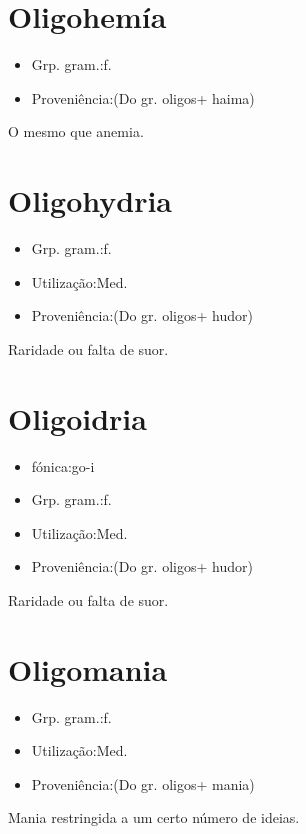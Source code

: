 \section{Oligohemía}
\begin{itemize}
\item {Grp. gram.:f.}
\end{itemize}
\begin{itemize}
\item {Proveniência:(Do gr. \textunderscore oligos\textunderscore  + \textunderscore haima\textunderscore )}
\end{itemize}
O mesmo que \textunderscore anemia\textunderscore .
\section{Oligohydria}
\begin{itemize}
\item {Grp. gram.:f.}
\end{itemize}
\begin{itemize}
\item {Utilização:Med.}
\end{itemize}
\begin{itemize}
\item {Proveniência:(Do gr. \textunderscore oligos\textunderscore  + \textunderscore hudor\textunderscore )}
\end{itemize}
Raridade ou falta de suor.
\section{Oligoidria}
\begin{itemize}
\item {fónica:go-i}
\end{itemize}
\begin{itemize}
\item {Grp. gram.:f.}
\end{itemize}
\begin{itemize}
\item {Utilização:Med.}
\end{itemize}
\begin{itemize}
\item {Proveniência:(Do gr. \textunderscore oligos\textunderscore  + \textunderscore hudor\textunderscore )}
\end{itemize}
Raridade ou falta de suor.
\section{Oligomania}
\begin{itemize}
\item {Grp. gram.:f.}
\end{itemize}
\begin{itemize}
\item {Utilização:Med.}
\end{itemize}
\begin{itemize}
\item {Proveniência:(Do gr. \textunderscore oligos\textunderscore  + \textunderscore mania\textunderscore )}
\end{itemize}
Mania restringida a um certo número de ideias.
